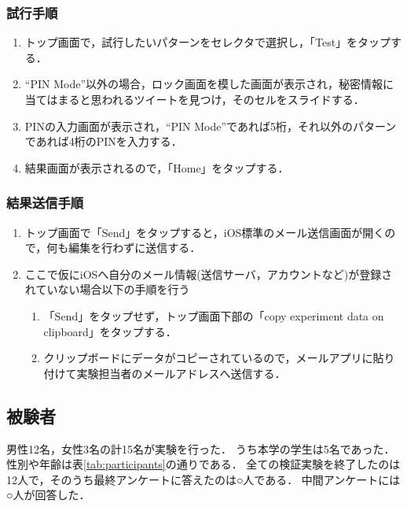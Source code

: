 \subsubsection{試行手順}
\begin{enumerate}
  \item トップ画面で，試行したいパターンをセレクタで選択し，「Test」をタップする．
  \item ``PIN Mode''以外の場合，ロック画面を模した画面が表示され，秘密情報に当てはまると思われるツイートを見つけ，そのセルをスライドする．
  \item PINの入力画面が表示され，``PIN Mode''であれば5桁，それ以外のパターンであれば4桁のPINを入力する．
  \item 結果画面が表示されるので，「Home」をタップする．
\end{enumerate}

\subsubsection{結果送信手順}
\begin{enumerate}
  \item トップ画面で「Send」をタップすると，iOS標準のメール送信画面が開くので，何も編集を行わずに送信する．
  \item ここで仮にiOSへ自分のメール情報(送信サーバ，アカウントなど)が登録されていない場合以下の手順を行う
  \begin{enumerate}
    \item 「Send」をタップせず，トップ画面下部の「copy experiment data on clipboard」をタップする．
    \item クリップボードにデータがコピーされているので，メールアプリに貼り付けて実験担当者のメールアドレスへ送信する．
  \end{enumerate}
\end{enumerate}

\subsection{被験者}
男性12名，女性3名の計15名が実験を行った．
うち本学の学生は5名であった．
性別や年齢は表\ref{tab:participants}の通りである．
全ての検証実験を終了したのは12人で，そのうち最終アンケートに答えたのは○人である．
中間アンケートには○人が回答した．

